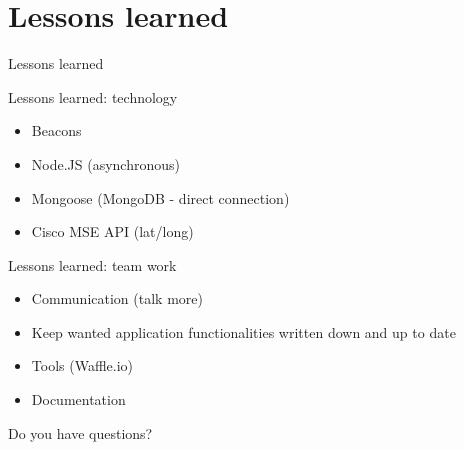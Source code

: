 \documentclass[11pt]{beamer}
\newcommand{\todo}[1]{\raisebox{0pt}{\parbox{0pt}{\begin{large}\colorbox{red}{todo: #1}\end{large} \hspace*{0.05cm}}}}
\begin{document}
\section{Lessons learned}

\begin{frame}{}

  \begin{center}

    {\Huge Lessons learned}

  \end{center}

\end{frame}


\begin{frame}{Lessons learned: technology}

  \begin{itemize}
    \item Beacons
    \item Node.JS (asynchronous)
    \item Mongoose (MongoDB - direct connection)
    \item Cisco MSE API (lat/long)
  \end{itemize}

\end{frame}

\begin{frame}{Lessons learned: team work}

  \begin{itemize}
    \item Communication (talk more)
    \item Keep wanted application functionalities written down and up to date
    \item Tools (Waffle.io)
    \item Documentation
  \end{itemize}

\end{frame}


\begin{frame}{}

	\begin{center}

		{\Huge Do you have questions?}

    \end{center}

\end{frame}
\end{document}
